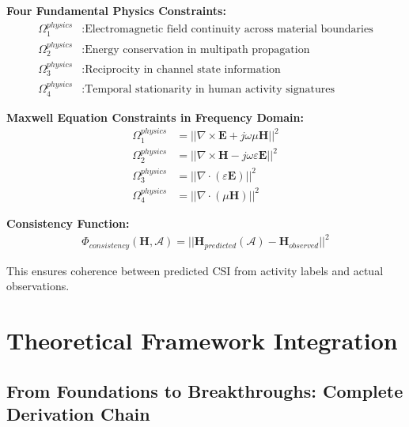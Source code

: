 \documentclass[12pt,a4paper]{article}
\begin{document}
\textbf{Four Fundamental Physics Constraints:}
\begin{align}
\Omega_1^{physics} &: \text{Electromagnetic field continuity across material boundaries} \label{eq:boundary_continuity}\\
\Omega_2^{physics} &: \text{Energy conservation in multipath propagation} \label{eq:energy_conservation}\\
\Omega_3^{physics} &: \text{Reciprocity in channel state information} \label{eq:channel_reciprocity}\\
\Omega_4^{physics} &: \text{Temporal stationarity in human activity signatures} \label{eq:temporal_stationarity}
\end{align}

\textbf{Maxwell Equation Constraints in Frequency Domain:}
\begin{align}
\Omega_1^{physics} &= ||\nabla \times \mathbf{E} + j\omega \mu \mathbf{H}||^2 \label{eq:faraday_constraint}\\
\Omega_2^{physics} &= ||\nabla \times \mathbf{H} - j\omega \varepsilon \mathbf{E}||^2 \label{eq:ampere_constraint}\\
\Omega_3^{physics} &= ||\nabla \cdot (\varepsilon \mathbf{E})||^2 \label{eq:gauss_constraint}\\
\Omega_4^{physics} &= ||\nabla \cdot (\mu \mathbf{H})||^2 \label{eq:monopole_constraint}
\end{align}

\textbf{Consistency Function:}
\begin{align}
\Phi_{consistency}(\mathbf{H}, \mathcal{A}) = ||\mathbf{H}_{predicted}(\mathcal{A}) - \mathbf{H}_{observed}||^2 \label{eq:consistency_function}
\end{align}

This ensures coherence between predicted CSI from activity labels and actual observations.

\section{Theoretical Framework Integration}

\subsection{From Foundations to Breakthroughs: Complete Derivation Chain}
\end{document}
